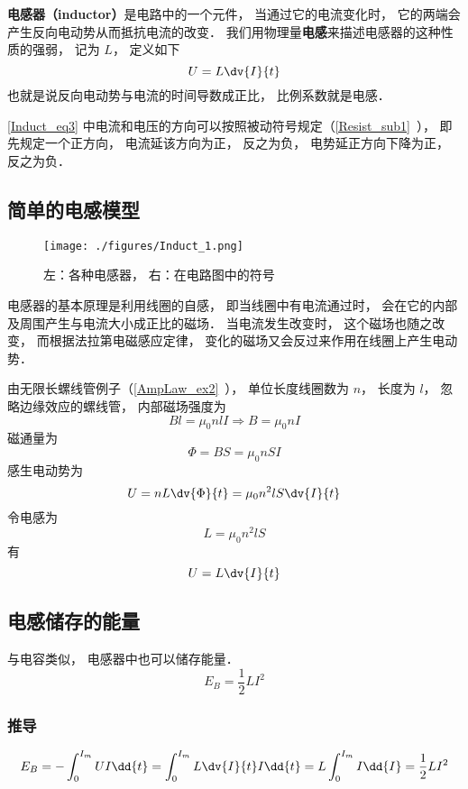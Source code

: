 
\begin{issues}
\issueAbstract
\end{issues}


\textbf{电感器（inductor）}是电路中的一个元件， 当通过它的电流变化时， 它的两端会产生反向电动势从而抵抗电流的改变． 我们用物理量\textbf{电感}来描述电感器的这种性质的强弱， 记为 $L$， 定义如下
\begin{equation}\label{Induct_eq3}
U = L\dv{I}{t}
\end{equation}
也就是说反向电动势与电流的时间导数成正比， 比例系数就是电感．

\autoref{Induct_eq3} 中电流和电压的方向可以按照被动符号规定（\autoref{Resist_sub1}~）， 即先规定一个正方向， 电流延该方向为正， 反之为负， 电势延正方向下降为正， 反之为负．

\subsection{简单的电感模型}

\begin{figure}[ht]
\centering
\texttt{[image: ./figures/Induct\_1.png]}
\caption{左：各种电感器， 右：在电路图中的符号} \label{Induct_fig1}
\end{figure}
电感器的基本原理是利用线圈的自感， 即当线圈中有电流通过时， 会在它的内部及周围产生与电流大小成正比的磁场． 当电流发生改变时， 这个磁场也随之改变， 而根据法拉第电磁感应定律， 变化的磁场又会反过来作用在线圈上产生电动势．

由无限长螺线管例子（\autoref{AmpLaw_ex2}~）， 单位长度线圈数为 $n$， 长度为 $l$， 忽略边缘效应的螺线管， 内部磁场强度为
\begin{equation}
Bl = \mu_0nlI \Rightarrow B = \mu_0nI
\end{equation}
磁通量为
\begin{equation}
\Phi = BS = \mu_0nSI
\end{equation}
感生电动势为
\begin{equation}
U = nL\dv{\Phi}{t} = \mu_0n^2lS \dv{I}{t}
\end{equation}
令电感为
\begin{equation}\label{Induct_eq1}
L = \mu_0n^2lS
\end{equation}
有
\begin{equation}\label{Induct_eq2}
U = L\dv{I}{t}
\end{equation}

\subsection{电感储存的能量}
与电容类似， 电感器中也可以储存能量．
\begin{equation}
E_B = \frac{1}{2}L I^2
\end{equation}

\subsubsection{推导}
\begin{equation}
E_B = -\int_0^{I_m} U I \dd{t} = \int_0^{I_m} L \dv{I}{t} I \dd{t} = L\int_0^{I_m} I \dd{I} = \frac{1}{2} L I^2
\end{equation}
